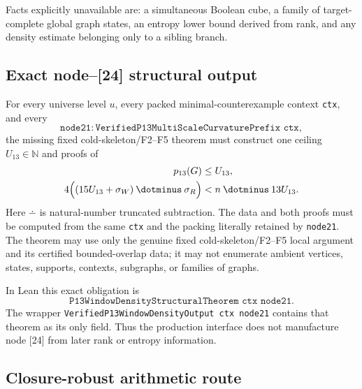 Facts explicitly unavailable are: a simultaneous Boolean cube, a family of
target-complete global graph states, an entropy lower bound derived from rank,
and any density estimate belonging only to a sibling branch.

\subsection*{Exact node--[24] structural output}

For every universe level $u$, every packed minimal-counterexample context
\texttt{ctx}, and every
\[
 \texttt{node21}:
 \texttt{VerifiedP13MultiScaleCurvaturePrefix ctx},
\]
the missing fixed cold-skeleton/F2--F5 theorem must construct one ceiling
$U_{13}\in\mathbb N$ and proofs of
\begin{align}
 p_{13}(G)&\le U_{13}, \label{repair:eq:packing-ceiling}\\
 4\Bigl((15U_{13}+\sigma_W)\mathbin{\dotminus}\sigma_R\Bigr)
 &< n\mathbin{\dotminus}13U_{13}. \label{repair:eq:window-quarter}
\end{align}
Here $\dotminus$ is natural-number truncated subtraction.  The data and both
proofs must be computed from the same \texttt{ctx} and the packing literally
retained by \texttt{node21}.  The theorem may use only the genuine fixed
cold-skeleton/F2--F5 local argument and its certified bounded-overlap data; it
may not enumerate ambient vertices, states, supports, contexts, subgraphs, or
families of graphs.

In Lean this exact obligation is
\[
 \texttt{P13WindowDensityStructuralTheorem ctx node21}.
\]
The wrapper
\texttt{VerifiedP13WindowDensityOutput ctx node21}
contains that theorem as its only field.  Thus the production interface does
not manufacture node [24] from later rank or entropy information.

\subsection*{Closure-robust arithmetic route}

